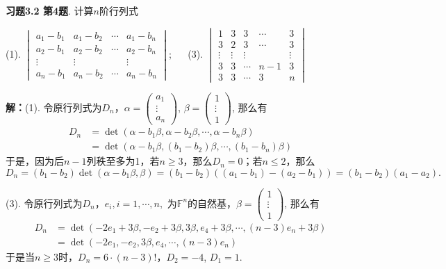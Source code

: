 
\renewcommand{\newpageorvspace}{\vspace{2em}}

\date{2021-10-29  第三次习题课}



\maketitle

{\bf 习题3.2 第4题}. 计算$n$阶行列式

(1). $\begin{vmatrix} a_1-b_1 & a_1-b_2 & \cdots & a_1-b_n \\ a_2-b_1 & a_2-b_2 & \cdots & a_2-b_n \\ \vdots & \vdots & & \vdots \\ a_n-b_1 & a_n-b_2 & \cdots & a_n-b_n \end{vmatrix}$; $\quad$ (3). $\begin{vmatrix} 1 & 3 & 3 & \cdots & 3 \\ 3 & 2 & 3 & \cdots & 3 \\ \vdots & \vdots & \vdots & & \vdots \\ 3 & 3 & \cdots & n-1 & 3 \\ 3 & 3 & \cdots & 3 & n \end{vmatrix}$

{\bf 解：}(1). 令原行列式为$D_n$，$\alpha = \begin{pmatrix} a_1 \\ \vdots \\ a_n \end{pmatrix}$, $\beta = \begin{pmatrix} 1 \\ \vdots \\ 1 \end{pmatrix}$, 那么有
\begin{align*}
D_n & = \det (\alpha-b_1\beta, \alpha-b_2\beta, \cdots, \alpha-b_n\beta) \\
& = \det (\alpha-b_1\beta, (b_1-b_2)\beta, \cdots, (b_1-b_n)\beta)
\end{align*}
于是，因为后$n-1$列秩至多为1，若$n \geqslant 3$，那么$D_n = 0$；若$n \leqslant 2$，那么
$$D_n = (b_1-b_2) \det (\alpha-b_1\beta, \beta) = (b_1-b_2)((a_1-b_1)-(a_2-b_1)) = (b_1-b_2)(a_1-a_2).$$

(3). 令原行列式为$D_n$，$e_i, i=1,\cdots,n,$ 为$\mathbb{F}^n$的自然基，$\beta = \begin{pmatrix} 1 \\ \vdots \\ 1 \end{pmatrix}$, 那么有
\begin{align*}
D_n & = \det (-2e_1+3\beta, -e_2+3\beta, 3\beta, e_4+3\beta, \cdots, (n-3)e_n+3\beta) \\
& = \det (-2e_1, -e_2, 3\beta, e_4, \cdots, (n-3)e_n)
\end{align*}
于是当$n \geqslant 3$时，$D_n = 6 \cdot (n-3)!$，$D_2 = -4$, $D_1 = 1$.

